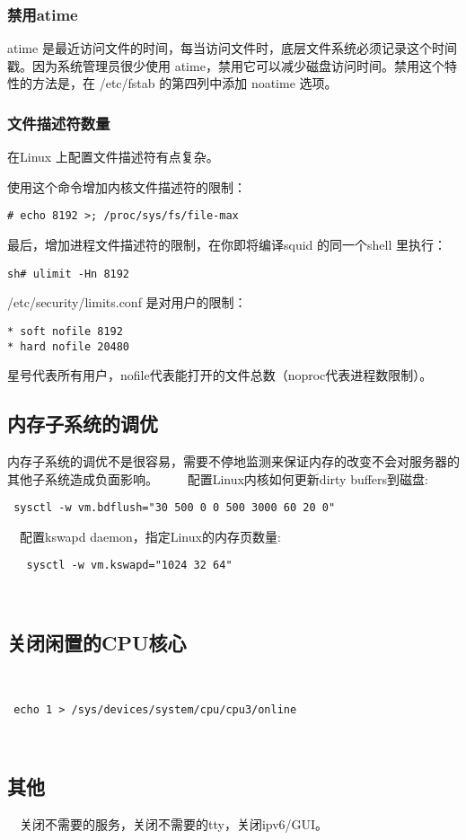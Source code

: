  \subsubsection{禁用atime}
 atime 是最近访问文件的时间，每当访问文件时，底层文件系统必须记录这个时间戳。因为系统管理员很少使用 atime，禁用它可以减少磁盘访问时间。禁用这个特性的方法是，在 /etc/fstab 的第四列中添加 noatime 选项。
 
 
\subsubsection{文件描述符数量}
在Linux 上配置文件描述符有点复杂。

使用这个命令增加内核文件描述符的限制：
\begin{verbatim}
# echo 8192 >; /proc/sys/fs/file-max
\end{verbatim}

最后，增加进程文件描述符的限制，在你即将编译squid 的同一个shell 里执行：
\begin{verbatim}
sh# ulimit -Hn 8192
\end{verbatim}
 
/etc/security/limits.conf 是对用户的限制：
\begin{verbatim}
* soft nofile 8192
* hard nofile 20480
\end{verbatim}
星号代表所有用户，nofile代表能打开的文件总数（noproc代表进程数限制）。


\subsection{内存子系统的调优}

 内存子系统的调优不是很容易，需要不停地监测来保证内存的改变不会对服务器的其他子系统造成负面影响。
　　配置Linux内核如何更新dirty buffers到磁盘:
　　   \begin{verbatim}
 sysctl -w vm.bdflush="30 500 0 0 500 3000 60 20 0"
\end{verbatim}
  　配置kswapd daemon，指定Linux的内存页数量:
　　   \begin{verbatim}
   sysctl -w vm.kswapd="1024 32 64"
    \end{verbatim}

　\subsection{关闭闲置的CPU核心}

　　   \begin{verbatim}
 echo 1 > /sys/devices/system/cpu/cpu3/online
    \end{verbatim}

　\subsection{其他}
　关闭不需要的服务，关闭不需要的tty，关闭ipv6/GUI。
 
 
 
 
 
 
 
 
 
 
 
 
 
